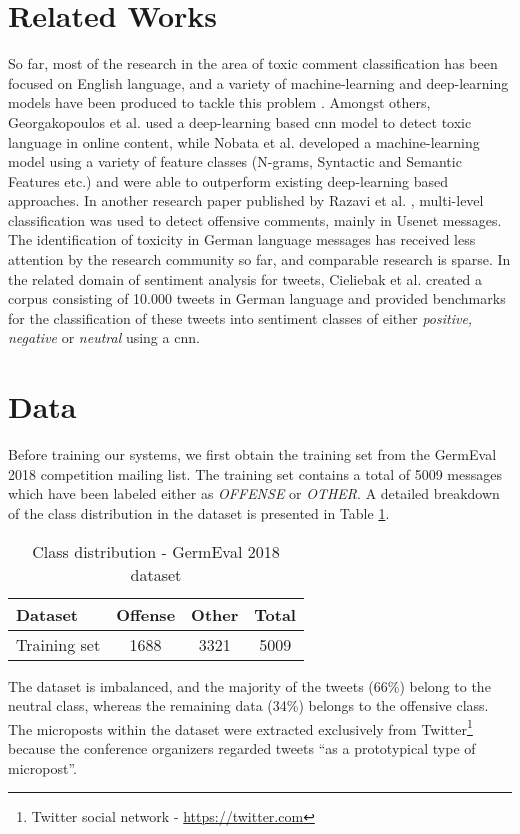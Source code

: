 \documentclass[11pt]{article}
\begin{document}
\section{Related Works}
So far, most of the research in the area of toxic comment classification has been focused on English language, and a variety of machine-learning and deep-learning models have been produced to tackle this problem \cite{RN56}.  Amongst others, Georgakopoulos et al.  used a deep-learning based \ac{cnn} model to detect toxic language in online content, while Nobata et al.  developed a machine-learning model using a variety of feature classes (N-grams, Syntactic and Semantic Features etc.) and were able to outperform existing deep-learning based approaches. In another research paper published by Razavi et al. , multi-level classification was used to detect offensive comments, mainly in Usenet messages. 
\newline
The identification of toxicity in German language messages has received less attention by the research community so far, and comparable research is sparse. In the related domain of sentiment analysis for tweets, Cieliebak et al.  created a corpus consisting of 10.000 tweets in German language and provided benchmarks for the classification of these tweets into sentiment classes of either \textit{positive, negative} or \textit{neutral} using a \ac{cnn}.   

\section{Data}
\label{sec:data}
Before training our systems, we first obtain the training set from the GermEval 2018 competition mailing list. The training set contains a total of 5009 messages which have been labeled either as \textit{OFFENSE} or \textit{OTHER}. A detailed breakdown of the class distribution in the dataset is presented in Table \ref{tbl:dataset}.
\begin{table}[h]
\begin{center}
\begin{tabular}{l c c c }
\toprule \bf Dataset &  Offense &  Other &  Total \\ \midrule
Training set & 1688 & 3321 & 5009 \\
\bottomrule
\end{tabular}
\end{center}
\caption{\label{tbl:dataset} Class distribution - GermEval 2018 dataset}
\end{table}
\newline
The dataset is imbalanced, and the majority of the tweets (66\%) belong to the neutral class, whereas the remaining data (34\%) belongs to the offensive class. The microposts within the dataset were extracted exclusively from Twitter\footnote{Twitter social network - \url{https://twitter.com}} because the conference organizers regarded tweets \enquote{as a prototypical type of micropost}\footnotemark[2].
\end{document}
